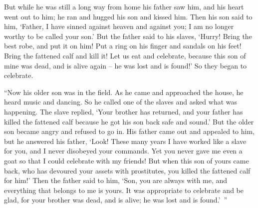 {But
while he was
still
a long way
from home his
father
saw
him,
and
his heart went out
to him; he ran
and hugged
his son
and
kissed
him.
Then
his son
said
to him,
‘Father,
I have sinned
against
heaven
and
against
you;
I am
no longer
worthy
to be called
your
son.’
But
the father
said
to
his
slaves, ‘Hurry! Bring
the best
robe,
and
put
it on
him! Put
a ring
on
his
finger
and
sandals
on
his feet!
Bring
the fattened
calf
and kill
it! Let
us eat
and
celebrate,
because
this
son
of mine
was
dead,
and
is alive again
– he was
lost
and
is found!’ So
they began
to celebrate.
\par }{\PP {}“Now his
older
son
was
in
the field.
As
he
came
and
approached
the house,
he heard
music
and
dancing.
So
he called
one
of the slaves
and asked
what
was happening.
The
slave replied, ‘Your
brother
has returned,
and
your
father
has killed
the fattened
calf
because
he got
his son
back
safe and sound.’
But
the older son became angry
and
refused
to go in.
His
father
came out
and appealed
to him,
but
he answered
his
father,
‘Look! These many
years
I have worked like a slave
for you,
and
I never
disobeyed
your
commands.
Yet
you
never
gave
me
even a goat
so that
I could celebrate
with
my
friends!
But
when
this
son
of yours
came back,
who has devoured
your
assets
with
prostitutes,
you killed
the fattened
calf
for him!’
Then
the father said
to him,
‘Son,
you
are
always
with
me,
and
everything
that belongs to me
is
yours.
It was appropriate
to celebrate
and
be glad,
for
your
brother
was
dead,
and
is alive;
he was lost
and
is found.’ ”

}
